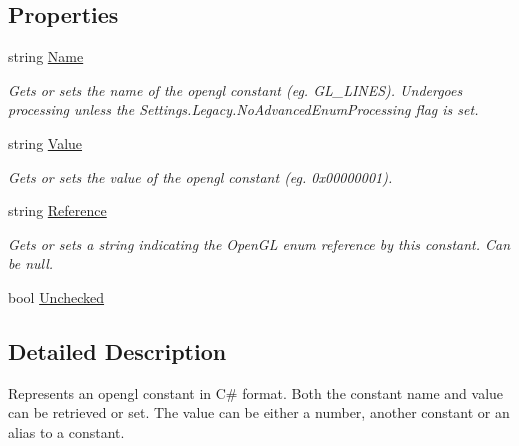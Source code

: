 \subsection*{Properties}
\begin{DoxyCompactItemize}
\item 
string \hyperlink{class_bind_1_1_structures_1_1_constant_a7100ac16bc69d767bc8fa40fb1f251b1}{Name}
\begin{DoxyCompactList}\small\item\em Gets or sets the name of the opengl constant (eg. GL\_\-LINES). Undergoes processing unless the Settings.Legacy.NoAdvancedEnumProcessing flag is set. \item\end{DoxyCompactList}\item 
string \hyperlink{class_bind_1_1_structures_1_1_constant_a17084b59dd24e9b609bd6d99d02c032e}{Value}
\begin{DoxyCompactList}\small\item\em Gets or sets the value of the opengl constant (eg. 0x00000001). \item\end{DoxyCompactList}\item 
string \hyperlink{class_bind_1_1_structures_1_1_constant_a7473ebe863be78dcade9d644c67791d1}{Reference}
\begin{DoxyCompactList}\small\item\em Gets or sets a string indicating the OpenGL enum reference by this constant. Can be null. \item\end{DoxyCompactList}\item 
bool \hyperlink{class_bind_1_1_structures_1_1_constant_a7b35ed6fa483e43f1799d37724d0b173}{Unchecked}
\end{DoxyCompactItemize}


\subsection{Detailed Description}
Represents an opengl constant in C\# format. Both the constant name and value can be retrieved or set. The value can be either a number, another constant or an alias to a constant. 

